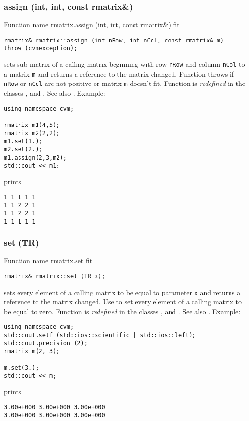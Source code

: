 \subsubsection{assign (int, int, const rmatrix\&)}
Function%
\pdfdest name {rmatrix.assign (int, int, const rmatrix&)} fit
\begin{verbatim}
rmatrix& rmatrix::assign (int nRow, int nCol, const rmatrix& m)
throw (cvmexception);
\end{verbatim}
sets sub-matrix of a calling matrix beginning with \Based row
\verb"nRow" and column \verb"nCol" to a matrix \verb"m" and
returns a reference to the matrix changed. Function throws 
  if \verb"nRow"
or \verb"nCol" are not positive or matrix \verb"m" doesn't fit.
Function is \emph{redefined} in the classes
, 
and .
See also .
Example:
\begin{Verbatim}
using namespace cvm;

rmatrix m1(4,5);
rmatrix m2(2,2);
m1.set(1.);
m2.set(2.);
m1.assign(2,3,m2);
std::cout << m1;
\end{Verbatim}
prints
\begin{Verbatim}
1 1 1 1 1
1 1 2 2 1
1 1 2 2 1
1 1 1 1 1
\end{Verbatim}
\newpage




\subsubsection{set (TR)}
Function%
\pdfdest name {rmatrix.set} fit
\begin{verbatim}
rmatrix& rmatrix::set (TR x);
\end{verbatim}
sets every element of a calling matrix to be equal to
parameter \verb"x" and returns a reference to
the matrix changed.
Use  to set every element
of a calling matrix to be equal to zero.
Function is \emph{redefined} in the classes
, 
and .
See also .
Example:
\begin{Verbatim}
using namespace cvm;
std::cout.setf (std::ios::scientific | std::ios::left);
std::cout.precision (2);
rmatrix m(2, 3);

m.set(3.);
std::cout << m;
\end{Verbatim}
prints
\begin{Verbatim}
3.00e+000 3.00e+000 3.00e+000
3.00e+000 3.00e+000 3.00e+000
\end{Verbatim}
\newpage



